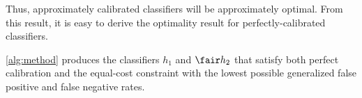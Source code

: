 Thus, approximately calibrated classifiers will be approximately optimal. From
this result, it is easy to derive the optimality result for perfectly-calibrated
classifiers.
%
\begin{thm}
  \label{thm:optimality}
  \autoref{alg:method} produces the classifiers $h_1$ and $\fair h_2$ that
  satisfy both perfect calibration and the equal-cost constraint with the lowest
  possible generalized false positive and false negative rates.
\end{thm}
